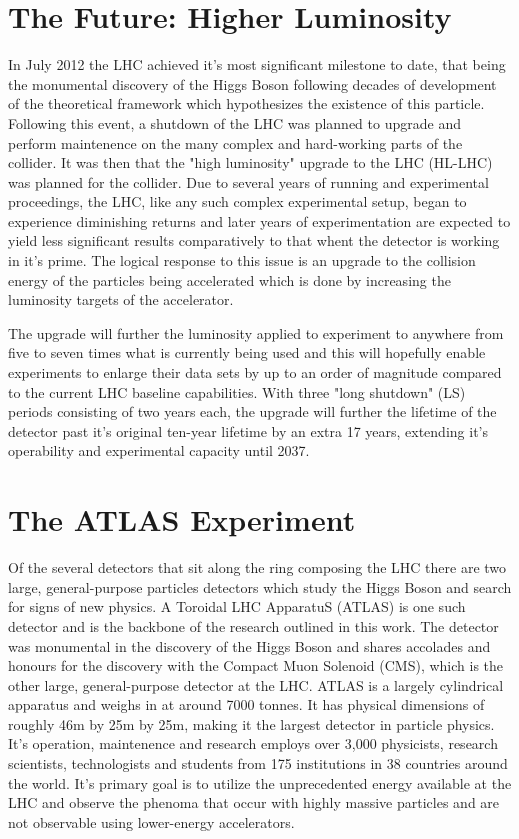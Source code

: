 \documentclass[letterpaper, 11pt]{report}
\begin{document}
\section{The Future: Higher Luminosity}

In July 2012 the LHC achieved it's most significant milestone to date, that being the monumental discovery of the Higgs Boson following decades of development of the theoretical framework which hypothesizes the existence of this particle.  Following this event, a shutdown of the LHC was planned to upgrade and perform maintenence on the many complex and hard-working parts of the collider.  It was then that the "high luminosity" upgrade to the LHC (HL-LHC) was planned for the collider.  Due to several years of running and experimental proceedings, the LHC, like any such complex experimental setup, began to experience diminishing returns and later years of experimentation are expected to yield less significant results comparatively to that whent the detector is working in it's prime.  The logical response to this issue is an upgrade to the collision energy of the particles being accelerated which is done by increasing the luminosity targets of the accelerator.

The upgrade will further the luminosity applied to experiment to anywhere from five to seven times what is currently being used and this will hopefully enable experiments to enlarge their data sets by up to an order of magnitude compared to the current LHC baseline capabilities.  With three "long shutdown" (LS) periods consisting of two years each, the upgrade will further the lifetime of the detector past it's original ten-year lifetime by an extra 17 years, extending it's operability and experimental capacity until 2037.

\section{The ATLAS Experiment}

Of the several detectors that sit along the ring composing the LHC there are two large, general-purpose particles detectors which study the Higgs Boson and search for signs of new physics. A Toroidal LHC ApparatuS (ATLAS) is one such detector and is the backbone of the research outlined in this work.  The detector was monumental in the discovery of the Higgs Boson and shares accolades and honours for the discovery with the Compact Muon Solenoid (CMS), which is the other large, general-purpose detector at the LHC.  ATLAS is a largely cylindrical apparatus and weighs in at around 7000 tonnes.  It has physical dimensions of roughly 46m by 25m by 25m, making it the largest detector in particle physics.  It's operation, maintenence and research employs over 3,000 physicists, research scientists, technologists and students from 175 institutions in 38 countries around the world. It's primary goal is to utilize the unprecedented energy available at the LHC and observe the phenoma that occur with highly massive particles and are not observable using lower-energy accelerators.
\end{document}
